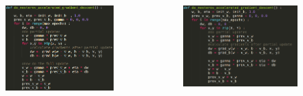 \begin{frame}
	\begin{columns}
		\begin{overlayarea}{\textwidth}{\textheight}
			\begin{figure}
				\includegraphics[scale=0.3]{images/module6/pseudo_code_nag_crop.png}
			\end{figure}
		\end{overlayarea}
		
		\begin{overlayarea}{\textwidth}{\textheight}
			\begin{figure}
				\includegraphics[scale=0.3]{images/module6/pseudo_code_stoch_nag_crop.png}
			\end{figure}
		\end{overlayarea}
	\end{columns}
\end{frame}



